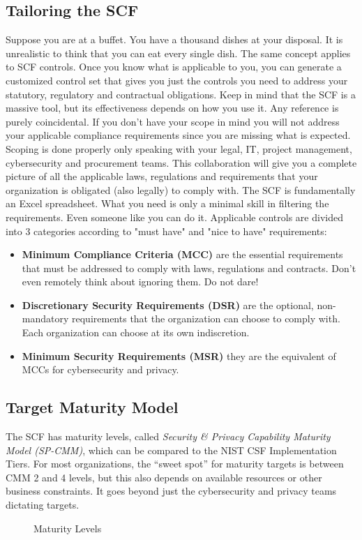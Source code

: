 \subsection{Tailoring the SCF}
Suppose you are at a buffet. You have a thousand dishes at your disposal. It is unrealistic to think that you can eat every single dish. The same concept applies to SCF controls. Once you know what is applicable to you, you can generate a customized control set that gives you just the controls you need to address your statutory, regulatory and contractual obligations. Keep in mind that the SCF is a massive tool, but its effectiveness depends on how you use it. Any reference is purely coincidental. If you don't have your scope in mind you will not address your applicable compliance requirements since you are missing what is expected. Scoping is done properly only speaking with your legal, IT, project management, cybersecurity and procurement teams. This collaboration will give you a complete picture of all the applicable laws, regulations and requirements that your organization is obligated (also legally) to comply with. The SCF is fundamentally an Excel spreadsheet. What you need is only a minimal skill in filtering the requirements. Even someone like you can do it. Applicable controls are divided into 3 categories according to "must have" and "nice to have" requirements:
\begin{itemize}
    \itemsep0em
    \item \textbf{Minimum Compliance Criteria (MCC)} are the essential requirements that must be addressed to comply with laws, regulations and contracts. Don't even remotely think about ignoring them. Do not dare!
    \item \textbf{Discretionary Security Requirements (DSR)} are the optional, non-mandatory requirements that the organization can choose to comply with. Each organization can choose at its own indiscretion.
    \item \textbf{Minimum Security Requirements (MSR)} they are the equivalent of MCCs for cybersecurity and privacy.
\end{itemize}
\subsection{Target Maturity Model}
The SCF has maturity levels, called \textit{Security \& Privacy Capability Maturity Model (SP-CMM)}, which can be compared to the NIST CSF Implementation Tiers. For most organizations, the “sweet spot” for maturity targets is between CMM 2 and 4 levels, but this also depends on available resources or other business constraints. It goes beyond just the cybersecurity and privacy teams dictating targets.
\begin{figure}[H]
  \centering
  
  \caption{Maturity Levels}
\end{figure}
\noindent
